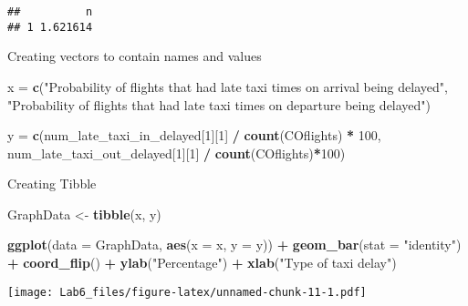 \documentclass[]{article}
\newenvironment{Shaded}{\begin{snugshade}}{\end{snugshade}}
\newcommand{\KeywordTok}[1]{\textcolor[rgb]{0.13,0.29,0.53}{\textbf{#1}}}
\newcommand{\DataTypeTok}[1]{\textcolor[rgb]{0.13,0.29,0.53}{#1}}
\newcommand{\DecValTok}[1]{\textcolor[rgb]{0.00,0.00,0.81}{#1}}
\newcommand{\StringTok}[1]{\textcolor[rgb]{0.31,0.60,0.02}{#1}}
\newcommand{\OperatorTok}[1]{\textcolor[rgb]{0.81,0.36,0.00}{\textbf{#1}}}
\newcommand{\NormalTok}[1]{#1}
\begin{document}
\begin{verbatim}
##          n
## 1 1.621614
\end{verbatim}

Creating vectors to contain names and values

\begin{Shaded}
\begin{Highlighting}[]
\NormalTok{x =}\StringTok{ }\KeywordTok{c}\NormalTok{(}\StringTok{"Probability of flights that had late taxi times on arrival being delayed"}\NormalTok{, }\StringTok{"Probability of flights that had late taxi times on departure being delayed"}\NormalTok{)}

\NormalTok{y =}\StringTok{ }\KeywordTok{c}\NormalTok{(num_late_taxi_in_delayed[}\DecValTok{1}\NormalTok{][}\DecValTok{1}\NormalTok{] }\OperatorTok{/}\StringTok{ }\KeywordTok{count}\NormalTok{(COflights) }\OperatorTok{*}\StringTok{ }\DecValTok{100}\NormalTok{, num_late_taxi_out_delayed[}\DecValTok{1}\NormalTok{][}\DecValTok{1}\NormalTok{] }\OperatorTok{/}\StringTok{ }\KeywordTok{count}\NormalTok{(COflights)}\OperatorTok{*}\DecValTok{100}\NormalTok{)}
\end{Highlighting}
\end{Shaded}

Creating Tibble

\begin{Shaded}
\begin{Highlighting}[]
\NormalTok{GraphData <-}\StringTok{ }\KeywordTok{tibble}\NormalTok{(x, y)}
\end{Highlighting}
\end{Shaded}

\begin{Shaded}
\begin{Highlighting}[]
\KeywordTok{ggplot}\NormalTok{(}\DataTypeTok{data =}\NormalTok{ GraphData, }\KeywordTok{aes}\NormalTok{(}\DataTypeTok{x =}\NormalTok{ x, }\DataTypeTok{y =}\NormalTok{ y)) }\OperatorTok{+}\StringTok{ }\KeywordTok{geom_bar}\NormalTok{(}\DataTypeTok{stat =} \StringTok{"identity"}\NormalTok{) }\OperatorTok{+}\StringTok{ }\KeywordTok{coord_flip}\NormalTok{() }\OperatorTok{+}\StringTok{ }\KeywordTok{ylab}\NormalTok{(}\StringTok{"Percentage"}\NormalTok{) }\OperatorTok{+}\StringTok{ }\KeywordTok{xlab}\NormalTok{(}\StringTok{"Type of taxi delay"}\NormalTok{)}
\end{Highlighting}
\end{Shaded}

\texttt{[image: Lab6\_files/figure-latex/unnamed-chunk-11-1.pdf]}
\end{document}
